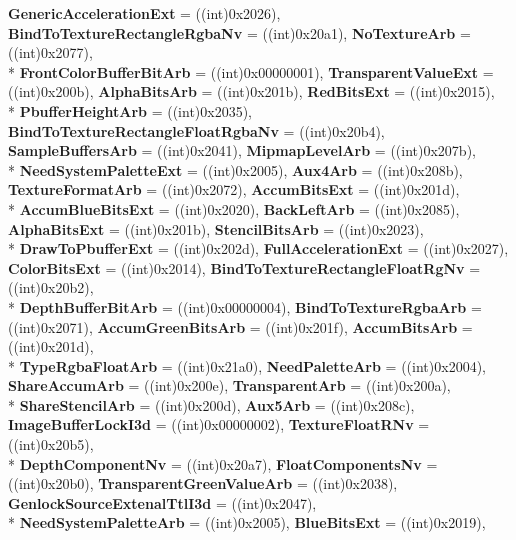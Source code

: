 \begin{DoxyCompactItemize}
{\bfseries Generic\-Acceleration\-Ext} = ((int)0x2026), 
{\bfseries Bind\-To\-Texture\-Rectangle\-Rgba\-Nv} = ((int)0x20a1), 
{\bfseries No\-Texture\-Arb} = ((int)0x2077), 
\\*
{\bfseries Front\-Color\-Buffer\-Bit\-Arb} = ((int)0x00000001), 
{\bfseries Transparent\-Value\-Ext} = ((int)0x200b), 
{\bfseries Alpha\-Bits\-Arb} = ((int)0x201b), 
{\bfseries Red\-Bits\-Ext} = ((int)0x2015), 
\\*
{\bfseries Pbuffer\-Height\-Arb} = ((int)0x2035), 
{\bfseries Bind\-To\-Texture\-Rectangle\-Float\-Rgba\-Nv} = ((int)0x20b4), 
{\bfseries Sample\-Buffers\-Arb} = ((int)0x2041), 
{\bfseries Mipmap\-Level\-Arb} = ((int)0x207b), 
\\*
{\bfseries Need\-System\-Palette\-Ext} = ((int)0x2005), 
{\bfseries Aux4\-Arb} = ((int)0x208b), 
{\bfseries Texture\-Format\-Arb} = ((int)0x2072), 
{\bfseries Accum\-Bits\-Ext} = ((int)0x201d), 
\\*
{\bfseries Accum\-Blue\-Bits\-Ext} = ((int)0x2020), 
{\bfseries Back\-Left\-Arb} = ((int)0x2085), 
{\bfseries Alpha\-Bits\-Ext} = ((int)0x201b), 
{\bfseries Stencil\-Bits\-Arb} = ((int)0x2023), 
\\*
{\bfseries Draw\-To\-Pbuffer\-Ext} = ((int)0x202d), 
{\bfseries Full\-Acceleration\-Ext} = ((int)0x2027), 
{\bfseries Color\-Bits\-Ext} = ((int)0x2014), 
{\bfseries Bind\-To\-Texture\-Rectangle\-Float\-Rg\-Nv} = ((int)0x20b2), 
\\*
{\bfseries Depth\-Buffer\-Bit\-Arb} = ((int)0x00000004), 
{\bfseries Bind\-To\-Texture\-Rgba\-Arb} = ((int)0x2071), 
{\bfseries Accum\-Green\-Bits\-Arb} = ((int)0x201f), 
{\bfseries Accum\-Bits\-Arb} = ((int)0x201d), 
\\*
{\bfseries Type\-Rgba\-Float\-Arb} = ((int)0x21a0), 
{\bfseries Need\-Palette\-Arb} = ((int)0x2004), 
{\bfseries Share\-Accum\-Arb} = ((int)0x200e), 
{\bfseries Transparent\-Arb} = ((int)0x200a), 
\\*
{\bfseries Share\-Stencil\-Arb} = ((int)0x200d), 
{\bfseries Aux5\-Arb} = ((int)0x208c), 
{\bfseries Image\-Buffer\-Lock\-I3d} = ((int)0x00000002), 
{\bfseries Texture\-Float\-R\-Nv} = ((int)0x20b5), 
\\*
{\bfseries Depth\-Component\-Nv} = ((int)0x20a7), 
{\bfseries Float\-Components\-Nv} = ((int)0x20b0), 
{\bfseries Transparent\-Green\-Value\-Arb} = ((int)0x2038), 
{\bfseries Genlock\-Source\-Extenal\-Ttl\-I3d} = ((int)0x2047), 
\\*
{\bfseries Need\-System\-Palette\-Arb} = ((int)0x2005), 
{\bfseries Blue\-Bits\-Ext} = ((int)0x2019), 

\end{DoxyCompactItemize}
